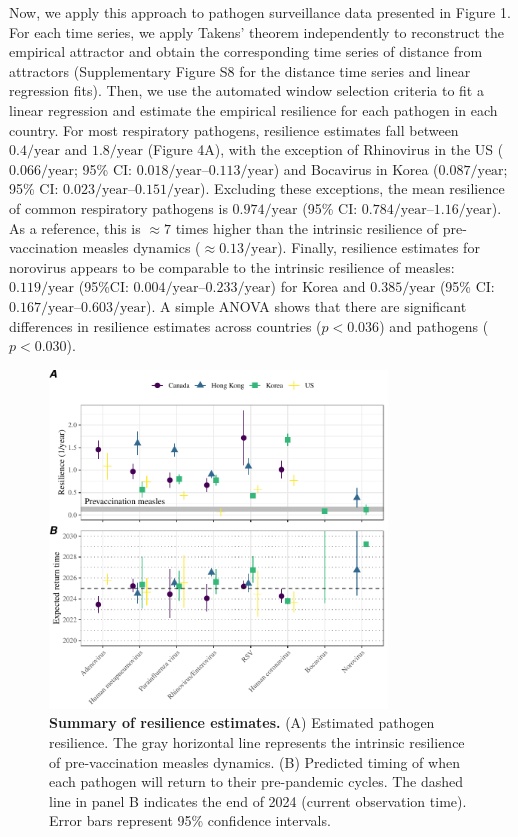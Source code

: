\documentclass[12pt]{article}
\begin{document}
Now, we apply this approach to pathogen surveillance data presented in Figure 1.
For each time series, we apply Takens' theorem independently to reconstruct the empirical attractor and obtain the corresponding time series of distance from attractors (Supplementary Figure S8 for the distance time series and linear regression fits).
Then, we use the automated window selection criteria to fit a linear regression and estimate the empirical resilience for each pathogen in each country.
For most respiratory pathogens, resilience estimates fall between $0.4/\mathrm{year}$ and $1.8/\mathrm{year}$ (Figure 4A), with the exception of Rhinovirus in the US ($0.066/\mathrm{year}$; 95\% CI: $0.018/\mathrm{year}$--$0.113/\mathrm{year}$) and Bocavirus in Korea ($0.087/\mathrm{year}$; 95\% CI: $0.023/\mathrm{year}$--$0.151/\mathrm{year}$).
Excluding these exceptions, the mean resilience of common respiratory pathogens is $0.974/\mathrm{year}$ (95\% CI: $0.784/\mathrm{year}$--$1.16/\mathrm{year}$).
As a reference, this is $\approx 7$ times higher than the intrinsic resilience of pre-vaccination measles dynamics ($\approx 0.13/\mathrm{year}$).
Finally, resilience estimates for norovirus appears to be comparable to the intrinsic resilience of measles: $0.119/\mathrm{year}$ (95\%CI: $0.004/\mathrm{year}$--$0.233/\mathrm{year}$) for Korea and $0.385/\mathrm{year}$ (95\% CI: $0.167/\mathrm{year}$--$0.603/\mathrm{year}$).
A simple ANOVA shows that there are significant differences in resilience estimates across countries ($p<0.036$) and pathogens ($p<0.030$).

\begin{figure}[!th]
\begin{center}
\includegraphics[width=0.8\textwidth]{../figure4/figure4.pdf}
\caption{
\textbf{Summary of resilience estimates.}
(A) Estimated pathogen resilience.
The gray horizontal line represents the intrinsic resilience of pre-vaccination measles dynamics.
(B) Predicted timing of when each pathogen will return to their pre-pandemic cycles.
The dashed line in panel B indicates the end of 2024 (current observation time).
Error bars represent 95\% confidence intervals.
}
\end{center}
\end{figure}
\end{document}
